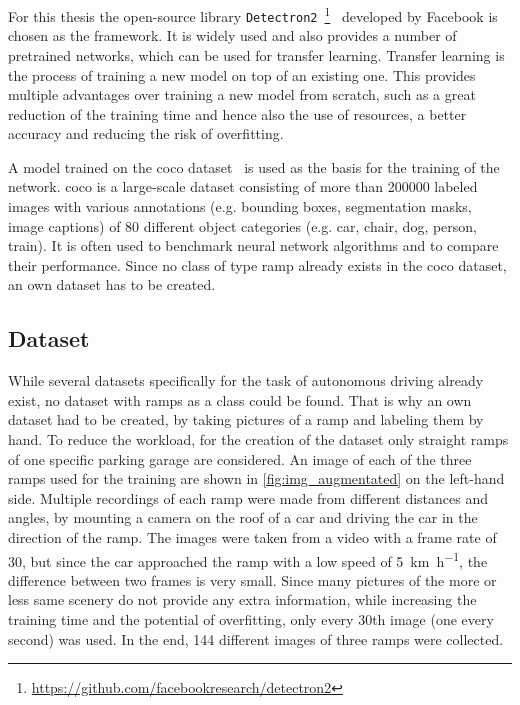 For this thesis the open-source library \texttt{Detectron2}~\footnote{\url{https://github.com/facebookresearch/detectron2}}~\cite{Wu2019} developed by Facebook is chosen as the framework.
It is widely used and also provides a number of pretrained networks, which can be used for transfer learning.
Transfer learning is the process of training a new model on top of an existing one.
This provides multiple advantages over training a new model from scratch, such as a great reduction of the training time and hence also the use of resources, a better accuracy and reducing the risk of overfitting.

A model trained on the \gls{coco} dataset~\cite{Lin2014} is used as the basis for the training of the network.
\gls{coco} is a large-scale dataset consisting of more than \num{200000} labeled images with various annotations (e.g. bounding boxes, segmentation masks, image captions) of 80 different object categories (e.g. car, chair, dog, person, train).
It is often used to benchmark neural network algorithms and to compare their performance.
Since no class of type ramp already exists in the \gls{coco} dataset, an own dataset has to be created.


\subsection{Dataset}
While several datasets specifically for the task of autonomous driving already exist, no dataset with ramps as a class could be found.
That is why an own dataset had to be created, by taking pictures of a ramp and labeling them by hand.
To reduce the workload, for the creation of the dataset only straight ramps of one specific parking garage are considered.
An image of each of the three ramps used for the training are shown in \cref{fig:img_augmentated} on the left-hand side.
Multiple recordings of each ramp were made from different distances and angles, by mounting a camera on the roof of a car and driving the car in the direction of the ramp.
The images were taken from a video with a frame rate of 30, but since the car approached the ramp with a low speed of \SI{5}{\kilo\metre\per\hour}, the difference between two frames is very small.
Since many pictures of the more or less same scenery do not provide any extra information, while increasing the training time and the potential of overfitting, only every 30th image (one every second) was used.
In the end, 144 different images of three ramps were collected.

